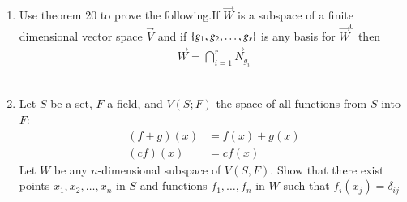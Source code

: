 \renewcommand{\theequation}{\theenumi}
\renewcommand{\thefigure}{\theenumi}
\begin{enumerate}[label=\thesubsection.\arabic*.,ref=\thesubsection.\theenumi]

\item Use theorem 20 to prove the following.If $\vec{W}$ is a subspace of a finite dimensional vector space $\vec{V}$ and if $\left\{g_1,g_2,\hdots,g_r\right\}$ is any basis for $\vec{W}^0$ then
\begin{align}
    \vec{W}=\bigcap_{i=1}^r \vec{N}_{g_i}
\end{align}
%
\\
\solution


\item Let $S$ be a set, $F$ a field, and $V(S;F)$ the space of all functions from $S$ into $F$:
\begin{align}
	\nonumber (f+g)(x) &= f(x) + g(x)\\
	\nonumber (cf)(x) &= cf(x)
\end{align}
Let $W$ be any $n$-dimensional  subspace of $V(S,F)$. Show that there exist points $x_1,x_2, \dots, x_n$ in $S$ and functions $f_1,\dots,f_n$ in $W$ such that $f_i(x_j) = \delta_{ij}$
%
\\
\solution

\end{enumerate}
